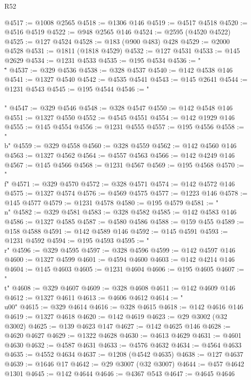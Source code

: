 \begin{lexlean}{R52}
\begin{coremodule}
{{{{{{{{{{{{{{{{{{{{{{{{{{{{{{{{{{{{{{{{{{{{{{{{{{{{{{{{{{{{{{{{{{{{{{{{{{{{{{{{{{{{{{{{{{{{{{{{{{{{{{{{{{{{{{{{{{{{{{{{{{{{{{{{{{{{{{{{{{{{{{{{{{{{{{{{{{{{{{{{{{{{{{{{{{{{{{{{{{{{{{{{{{{{{{{{{{{{{{@4517 := @1008 @2565
@4518 := @1306 @146
@4519 := @4517 @4518
@4520 := @4516 @4519
@4522 := @948 @2565 @146
@4524 := @2595 (@4520 @4522)
@4525 := @127 @4524
@4528 := @183 (@900 @483) @428
@4529 := @2000 @4528
@4531 := @1811 (@1818 @4529)
@4532 := @127 @4531
@4533 := @145 @2629
@4534 := @1231 @4533
@4535 := @195 @4534
@4536 := "\\\""
@4537 := @329 @4536
@4538 := @328 @4537
@4540 := @142 @4538 @146
@4541 := @1327 @4540
@4542 := @4535 @4541
@4543 := @145 @2641
@4544 := @1231 @4543
@4545 := @195 @4544
@4546 := "\\\\"
@4547 := @329 @4546
@4548 := @328 @4547
@4550 := @142 @4548 @146
@4551 := @1327 @4550
@4552 := @4545 @4551
@4554 := @142 @1929 @146
@4555 := @145 @4554
@4556 := @1231 @4555
@4557 := @195 @4556
@4558 := "\\b"
@4559 := @329 @4558
@4560 := @328 @4559
@4562 := @142 @4560 @146
@4563 := @1327 @4562
@4564 := @4557 @4563
@4566 := @142 @4249 @146
@4567 := @145 @4566
@4568 := @1231 @4567
@4569 := @195 @4568
@4570 := "\\f"
@4571 := @329 @4570
@4572 := @328 @4571
@4574 := @142 @4572 @146
@4575 := @1327 @4574
@4576 := @4569 @4575
@4577 := @1223 @146
@4578 := @145 @4577
@4579 := @1231 @4578
@4580 := @195 @4579
@4581 := "\\n"
@4582 := @329 @4581
@4583 := @328 @4582
@4585 := @142 @4583 @146
@4586 := @1327 @4585
@4587 := @4580 @4586
@4588 := @159 @455
@4589 := @158 @4588
@4591 := @142 @4589 @146
@4592 := @145 @4591
@4593 := @1231 @4592
@4594 := @195 @4593
@4595 := "\\r"
@4596 := @329 @4595
@4597 := @328 @4596
@4599 := @142 @4597 @146
@4600 := @1327 @4599
@4601 := @4594 @4600
@4603 := @142 @4214 @146
@4604 := @145 @4603
@4605 := @1231 @4604
@4606 := @195 @4605
@4607 := "\\t"
@4608 := @329 @4607
@4609 := @328 @4608
@4611 := @142 @4609 @146
@4612 := @1327 @4611
@4613 := @4606 @4612
@4614 := "\\u00"
@4615 := @329 @4614
@4616 := @328 @4615
@4618 := @142 @4616 @146
@4619 := @1327 @4618
@4620 := @142 @4619
@4623 := @29 @3002 (@32 @3002)
@4625 := @139 @4623 @147
@4627 := @142 @4625 @146
@4628 := @4620 @4627
@4629 := @1322 @4628
@4630 := @4613 @4629
@4631 := @4601 @4630
@4632 := @4587 @4631
@4633 := @4576 @4632
@4634 := @4564 @4633
@4635 := @4552 @4634
@4637 := @1208 (@4542 @4635)
@4638 := @127 @4637
@4639 := @1646 @17
@4642 := @29 @3007 (@32 @3007)
@4644 := @457 @4642 @1301
@4645 := @142 @4644
@4646 := @4367 @543
@4647 := @4645 @4646
}}}}}}}}}}}}}}}}}}}}}}}}}}}}}}}}}}}}}}}}}}}}}}}}}}}}}}}}}}}}}}}}}}}}}}}}}}}}}}}}}}}}}}}}}}}}}}}}}}}}}}}}}}}}}}}}}}}}}}}}}}}}}}}}}}}}}}}}}}}}}}}}}}}}}}}}}}}}}}}}}}}}}}}}}}}}}}}}}}}}}}}}}}}}}}}}}}}}}}
\end{coremodule}
\end{lexlean}
